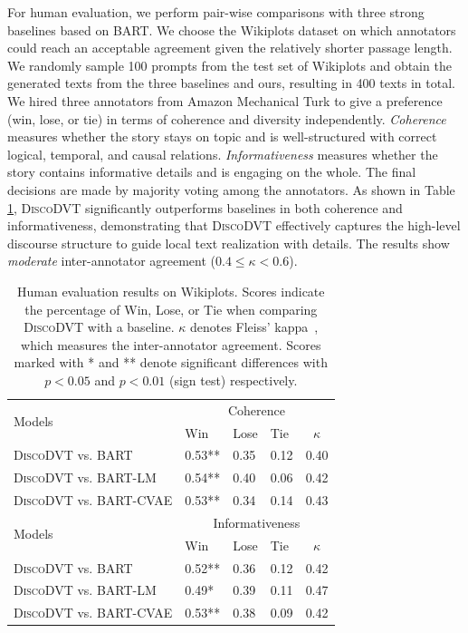 \documentclass[11pt]{article}
\begin{document}
For human evaluation, we perform pair-wise comparisons with three strong baselines based on BART. We choose the Wikiplots dataset on which annotators could reach an acceptable agreement given the relatively shorter passage length. We randomly sample 100 prompts from the test set of Wikiplots and obtain the generated texts from the three baselines and ours, resulting in 400 texts in total. We hired three annotators from Amazon Mechanical Turk to give a preference (win, lose, or tie) in terms of coherence and diversity independently. \textit{Coherence} measures whether the story stays on topic and is well-structured with correct logical, temporal, and causal relations. \textit{Informativeness} measures whether the story contains informative details and is engaging on the whole. The final decisions are made by majority voting among the annotators. As shown in Table \ref{tab:human}, \textsc{DiscoDVT} significantly outperforms baselines in both coherence and informativeness, demonstrating that \textsc{DiscoDVT} effectively captures the high-level discourse structure to guide local text realization with details. The results show \textit{moderate} inter-annotator agreement ($0.4\le \kappa < 0.6$).

\begin{table}[t!]
    \centering
    \scriptsize
    \begin{tabular}{l| lll | c}
    \toprule[1pt]
    \multirow{2}{*}{Models} & \multicolumn{4}{c}{Coherence}\\
     & Win & Lose & Tie & $\kappa$ \\
    \midrule[0.5pt]
    \textsc{DiscoDVT} vs. BART & 0.53** & 0.35 & 0.12 & 0.40 \\
    \textsc{DiscoDVT} vs. BART-LM & 0.54** & 0.40 & 0.06 & 0.42 \\
    \textsc{DiscoDVT} vs. BART-CVAE & 0.53** & 0.34 & 0.14 & 0.43 \\
    \midrule[0.5pt]
    \midrule[0.5pt]
    \multirow{2}{*}{Models} & \multicolumn{4}{c}{Informativeness}\\
     & Win & Lose & Tie & $\kappa$ \\
    \midrule[0.5pt]
    \textsc{DiscoDVT} vs. BART & 0.52** & 0.36 & 0.12 & 0.42 \\
    \textsc{DiscoDVT} vs. BART-LM & 0.49* & 0.39 & 0.11 & 0.47 \\
    \textsc{DiscoDVT} vs. BART-CVAE & 0.53** & 0.38 & 0.09 & 0.42 \\
    \bottomrule[1pt]
    \end{tabular}
    \caption{Human evaluation results on Wikiplots. Scores indicate the percentage of Win, Lose, or Tie when comparing \textsc{DiscoDVT} with a baseline. $\kappa$ denotes Fleiss' kappa~\citep{Fleiss1971MeasuringNS}, which measures the inter-annotator agreement. Scores marked with * and ** denote significant differences with $p<0.05$ and $p<0.01$ (sign test) respectively.}
    \label{tab:human}
    \vspace{-10pt}
\end{table}
\end{document}
